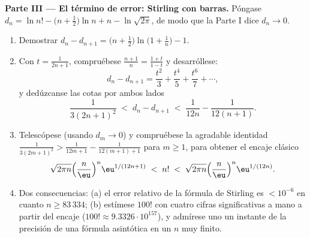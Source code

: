 \begin{problem}
\medskip
\noindent\textbf{Parte III --- El término de error: Stirling con
barras.} Póngase $d_n = \ln n! - \bigl(n + \tfrac12\bigr)\ln n + n -
\ln\sqrt{2\pi}$, de modo que la Parte I dice $d_n \to 0$.
\begin{enumerate}[resume]
  \item Demostrar $d_n - d_{n+1} = \bigl(n +
        \tfrac12\bigr)\ln\bigl(1 + \tfrac1n\bigr) - 1$. \item Con
  $t = \frac1{2n+1}$, compruébese $\frac{n+1}n =
        \frac{1+t}{1-t}$ y desarróllese:
        \[
        d_n - d_{n+1} = \frac{t^2}3 + \frac{t^4}5 +
        \frac{t^6}7 + \cdots,
        \]
        y dedúzcanse las cotas por ambos lados
        \[
        \frac1{3(2n+1)^2} \;<\; d_n - d_{n+1} \;<\;
        \frac1{12n} - \frac1{12(n+1)} .
        \]
  \item Telescópese (usando $d_m \to 0$) y compruébese la agradable
  identidad 
  $\frac1{3(2m+1)^2} >
        \frac1{12m+1} - \frac1{12(m+1)+1}$ para $m \geq 1$, para obtener
  el encaje clásico
        \[
        \sqrt{2\pi n}\Bigl(\frac n\eu\Bigr)^n
        \eu^{1/(12n+1)} \;<\; n! \;<\;
        \sqrt{2\pi n}\Bigl(\frac n\eu\Bigr)^n\eu^{1/(12n)} .
        \]
  \item Dos consecuencias: (a) el error relativo de la fórmula de
  Stirling es $< 10^{-6}$ en cuanto $n \geq 83\,334$; (b) estímese
  $100!$ con cuatro cifras significativas a mano a partir del encaje
  ($100! \approx 9.3326\cdot
        10^{157}$), y admírese uno un instante de la precisión de una
  fórmula asintótica en un $n$ muy finito.
\end{enumerate}


\end{problem}
